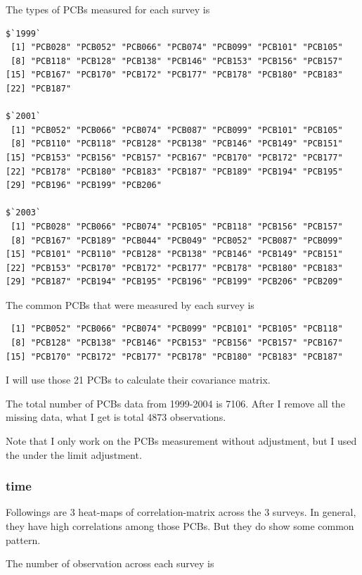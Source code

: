 \documentclass[]{article}
\begin{document}
The types of PCBs measured for each survey is

\begin{verbatim}
$`1999`
 [1] "PCB028" "PCB052" "PCB066" "PCB074" "PCB099" "PCB101" "PCB105"
 [8] "PCB118" "PCB128" "PCB138" "PCB146" "PCB153" "PCB156" "PCB157"
[15] "PCB167" "PCB170" "PCB172" "PCB177" "PCB178" "PCB180" "PCB183"
[22] "PCB187"

$`2001`
 [1] "PCB052" "PCB066" "PCB074" "PCB087" "PCB099" "PCB101" "PCB105"
 [8] "PCB110" "PCB118" "PCB128" "PCB138" "PCB146" "PCB149" "PCB151"
[15] "PCB153" "PCB156" "PCB157" "PCB167" "PCB170" "PCB172" "PCB177"
[22] "PCB178" "PCB180" "PCB183" "PCB187" "PCB189" "PCB194" "PCB195"
[29] "PCB196" "PCB199" "PCB206"

$`2003`
 [1] "PCB028" "PCB066" "PCB074" "PCB105" "PCB118" "PCB156" "PCB157"
 [8] "PCB167" "PCB189" "PCB044" "PCB049" "PCB052" "PCB087" "PCB099"
[15] "PCB101" "PCB110" "PCB128" "PCB138" "PCB146" "PCB149" "PCB151"
[22] "PCB153" "PCB170" "PCB172" "PCB177" "PCB178" "PCB180" "PCB183"
[29] "PCB187" "PCB194" "PCB195" "PCB196" "PCB199" "PCB206" "PCB209"
\end{verbatim}

The common PCBs that were measured by each survey is

\begin{verbatim}
 [1] "PCB052" "PCB066" "PCB074" "PCB099" "PCB101" "PCB105" "PCB118"
 [8] "PCB128" "PCB138" "PCB146" "PCB153" "PCB156" "PCB157" "PCB167"
[15] "PCB170" "PCB172" "PCB177" "PCB178" "PCB180" "PCB183" "PCB187"
\end{verbatim}

I will use those 21 PCBs to calculate their covariance matrix.

The total number of PCBs data from 1999-2004 is 7106. After I remove all
the missing data, what I get is total 4873 observations.

Note that I only work on the PCBs measurement without adjustment, but I
used the under the limit adjustment.

\subsubsection{time}\label{time}

Followings are 3 heat-maps of correlation-matrix across the 3 surveys.
In general, they have high correlations among those PCBs. But they do
show some common pattern.

The number of observation across each survey is
\end{document}
